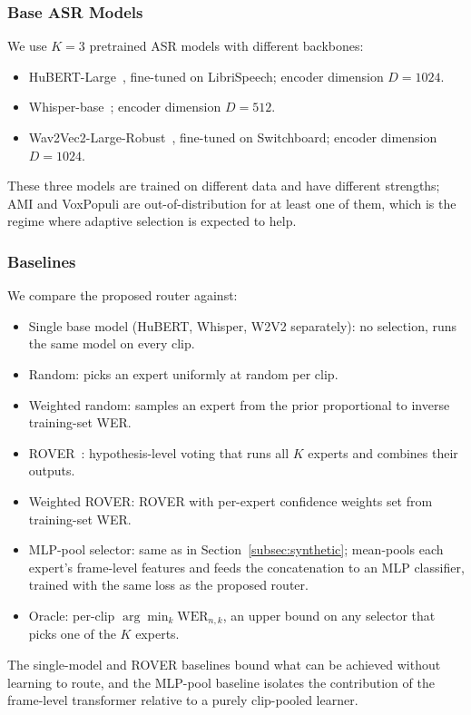 \documentclass[journal]{IEEEtran}
\begin{document}
\subsubsection{Base ASR Models}

We use $K=3$ pretrained ASR models with different backbones:
\begin{itemize}
    \item HuBERT-Large~\cite{hsu2021hubert}, fine-tuned on
    LibriSpeech;
    encoder dimension $D=1024$.
    \item Whisper-base~\cite{radford2022whisper};
    encoder dimension $D=512$.
    \item Wav2Vec2-Large-Robust~\cite{baevski2020wav2vec}, fine-tuned
    on Switchboard;
    encoder
    dimension $D=1024$.
\end{itemize}
These three models are trained on different data and have different
strengths; AMI and VoxPopuli are out-of-distribution for at least one
of them, which is the regime where adaptive selection is expected to
help.

\subsubsection{Baselines}

We compare the proposed router against:
\begin{itemize}
    \item Single base model (HuBERT, Whisper, W2V2 separately): no
    selection, runs the same model on every clip.
    \item Random: picks an expert uniformly at random per clip.
    \item Weighted random: samples an expert from the prior
    proportional to inverse training-set WER.
    \item ROVER~\cite{fiscus1997rover}: hypothesis-level voting that
    runs all $K$ experts and combines their outputs.
    \item Weighted ROVER: ROVER with per-expert confidence weights
    set from training-set WER.
    \item MLP-pool selector: same as in
    Section~\ref{subsec:synthetic}; mean-pools each expert's
    frame-level features and feeds the concatenation to an MLP
    classifier, trained with the same loss as the proposed router.
    \item Oracle: per-clip $\arg\min_k\mathrm{WER}_{n,k}$, an upper
    bound on any selector that picks one of the $K$ experts.
\end{itemize}
The single-model and ROVER baselines bound what can be achieved
without learning to route, and the MLP-pool baseline isolates the
contribution of the frame-level transformer relative to a purely
clip-pooled learner.
\end{document}
